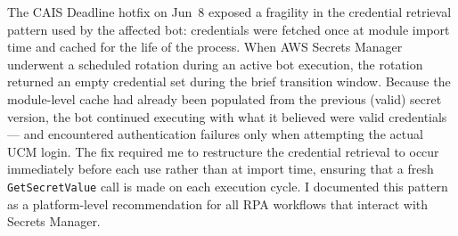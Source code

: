 The CAIS Deadline hotfix on Jun~8 exposed a fragility in the credential
retrieval pattern used by the affected bot: credentials were fetched once at
module import time and cached for the life of the process. When AWS Secrets
Manager underwent a scheduled rotation during an active bot execution, the
rotation returned an empty credential set during the brief transition window.
Because the module-level cache had already been populated from the previous
(valid) secret version, the bot continued executing with what it believed were
valid credentials --- and encountered authentication failures only when
attempting the actual UCM login. The fix required me to restructure the credential
retrieval to occur immediately before each use rather than at import time,
ensuring that a fresh \texttt{GetSecretValue} call is made on each execution
cycle. I documented this pattern as a platform-level recommendation for all
RPA workflows that interact with Secrets Manager.
